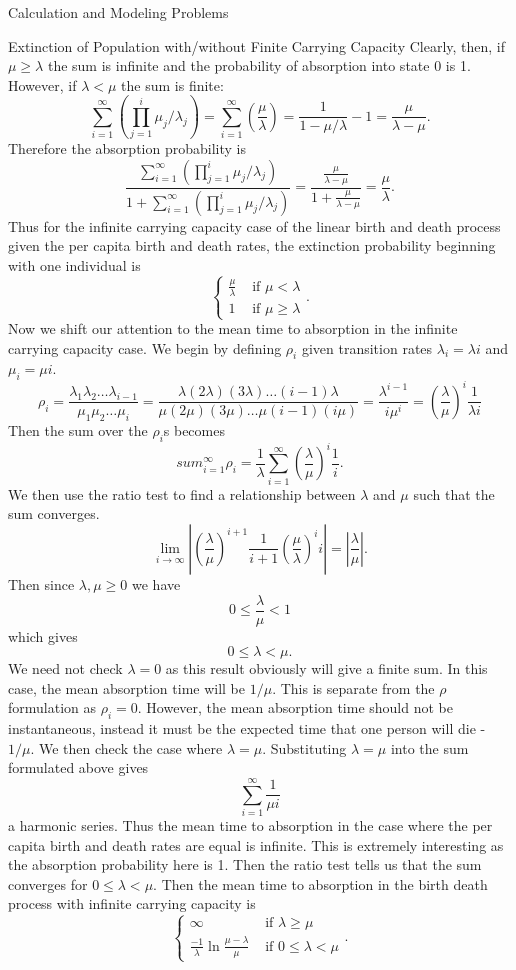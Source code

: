 \documentclass[12pt]{article}
\numberwithin{equation}{section}
\begin{document}
\begin{section}{Calculation and Modeling Problems}
\begin{subsection}{Extinction of Population with/without Finite Carrying Capacity}
    Clearly, then, if $\mu\geq\lambda$ the sum is infinite and the probability of absorption into state 0 is 1. However, if $\lambda<\mu$ the sum is finite:
    $$\sum_{i=1}^\infty\left(\prod_{j=1}^i \mu_j/\lambda_j\right)=\sum_{i=1}^\infty\left(\frac{\mu}{\lambda}\right)=\frac{1}{1-\mu/\lambda}-1=\frac{\mu}{\lambda-\mu}.$$
    Therefore the absorption probability is
    $$\frac{\sum_{i=1}^\infty\left(\prod_{j=1}^i \mu_j/\lambda_j\right)}{1+\sum_{i=1}^\infty\left(\prod_{j=1}^i\mu_j/\lambda_j\right)}=\frac{\frac{\mu}{\lambda-\mu}}{1+\frac{\mu}{\lambda-\mu}}=\frac{\mu}{\lambda}.$$
    Thus for the infinite carrying capacity case of the linear birth and death process given the per capita birth and death rates, the extinction probability beginning with one individual is
    $$\left\{\begin{array}{cc}\frac{\mu}{\lambda} & \text{ if }\mu<\lambda\\1&\text{ if }\mu\geq\lambda\end{array}\right..$$
    Now we shift our attention to the mean time to absorption in the infinite carrying capacity case. We begin by defining $\rho_i$ given transition rates $\lambda_i=\lambda i$ and $\mu_i=\mu i$.
    $$\rho_i=\frac{\lambda_1\lambda_2\dots\lambda_{i-1}}{\mu_1\mu_2\dots\mu_i}=\frac{\lambda(2\lambda)(3\lambda)\dots(i-1)\lambda}{\mu(2\mu)(3\mu)\dots\mu(i-1)(i \mu)}=\frac{\lambda^{i-1}}{i\mu^i}=\left(\frac{\lambda}{\mu}\right)^i\frac{1}{\lambda i}$$
    Then the sum over the $\rho_i$s becomes
    $$sum_{i=1}^\infty\rho_i=\frac{1}{\lambda}\sum_{i=1}^\infty\left(\frac{\lambda}{\mu}\right)^i\frac{1}{i}.$$
    We then use the ratio test to find a relationship between $\lambda$ and $\mu$ such that the sum converges.
    $$\lim_{i\to\infty}\left|\left(\frac{\lambda}{\mu}\right)^{i+1}\frac{1}{i+1}\left(\frac{\mu}{\lambda}\right)^i i\right|=\left|\frac{\lambda}{\mu}\right|.$$
    Then since $\lambda,\mu\geq 0$ we have
    $$0\leq \frac{\lambda}{\mu}<1$$
    which gives
    $$0\leq\lambda<\mu.$$
    We need not check $\lambda=0$ as this result obviously will give a finite sum. In this case, the mean absorption time will be $1/\mu$. This is separate from the $\rho$ formulation as $\rho_i=0$. However, the mean absorption time should not be instantaneous, instead it must be the expected time that one person will die - $1/\mu$. We then check the case where $\lambda=\mu$. Substituting $\lambda=\mu$ into the sum formulated above gives
    $$\sum_{i=1}^\infty \frac{1}{\mu i}$$
    a harmonic series. Thus the mean time to absorption in the case where the per capita birth and death rates are equal is infinite. This is extremely interesting as the absorption probability here is 1. Then the ratio test tells us that the sum converges for $0\leq\lambda<\mu$. Then the mean time to absorption in the birth death process with infinite carrying capacity is
    $$\left\{\begin{array}{cc}\infty &\text{ if }\lambda\geq\mu\\ \frac{-1}{\lambda}\ln{\frac{\mu-\lambda}{\mu}}& \text{ if }0\leq \lambda<\mu\end{array}\right..$$


\end{subsection}
\end{section}
\end{document}
